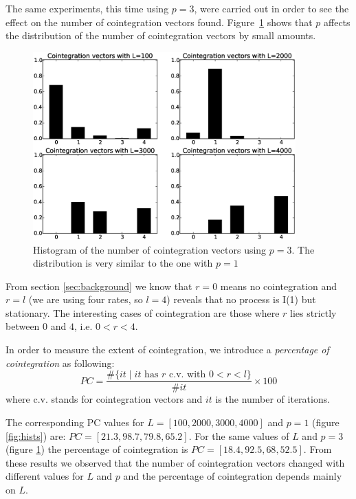 The same experiments, this time using $p=3$, were carried out in order to see the
effect on the number of cointegration vectors found. 
Figure~\ref{fig:histsp3} shows that $p$ affects the distribution of the number of cointegration vectors by small amounts.

\begin{figure}[!h]
  \centering
  \includegraphics[width=0.9\textwidth]{img/histCointVectors-offset20520-p-3-freq-10s}
  \caption{Histogram of the number of cointegration vectors using $p=3$. The distribution is very similar to the one with $p=1$}
   \label{fig:histsp3}
\end{figure}

From section \ref{sec:background} we know that $r=0$ means no cointegration and $r=l$ (we are using four rates, so $l=4$) reveals that no process is I(1) but stationary.
The interesting cases of cointegration are those where $r$ lies strictly
between $0$ and $4$, i.e. $0<r<4$.

In order to measure the extent of cointegration, we introduce a
{\em percentage of cointegration\/} as following:
\begin{equation} \label{eq:pcoint}
PC = 
\frac{\#\{ it \mid \text{$it$ has $r$ c.v. with $0<r<l$}\}}
     {\#it}\times 100
\end{equation}
where c.v. stands for cointegration vectors and $it$ is the number of iterations.
 
The corresponding PC values for $L = [100, 2000, 3000, 4000]$ and $p=1$ (figure  \ref{fig:hists}) are: $PC = [21.3, 98.7, 79.8,  65.2]$. For the same values of $L$ and $p=3$ (figure  \ref{fig:histsp3}) the percentage of cointegration is $PC = [18.4, 92.5, 68,  52.5]$. From these results we observed that the number of cointegration vectors changed with different values for $L$ and $p$ and the percentage of cointegration depends mainly on $L$. 


